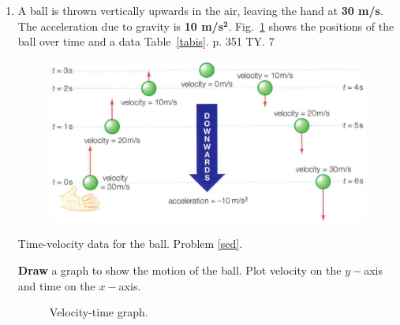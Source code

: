 \documentclass[A4,12pt]{article}
\begin{document}
\begin{enumerate}[label=\bfseries (\arabic*)]
\item \label{sed} A ball is thrown vertically upwards in the air, leaving the hand at \textbf{30 m/s}. The acceleration due to gravity is \textbf{10 m/s}$\bm{^2}$. Fig.~\ref{pijiji} shows the positions of the ball over time and a data Table~\ref{tabis}. \cite{CCEADA} p. 351 TY. 7
%
\begin{figure}[H]
    \centering
    \includegraphics[scale=0.5]{TY.png}
    \caption{}
    \label{pijiji}
\end{figure}
%
\begin{table}[H]
    \centering
    \caption{Time-velocity data for the ball. Problem \ref{sed}.}
    \caption{}
    \label{tabis}
\end{table}
%
\textbf{Draw} a graph to show the motion of the ball. Plot velocity on the $y-$axis and time on the $x-$axis. 
%
%
\begin{figure}[H]
    \centering
    \caption{Velocity-time graph.}
    \label{fig:my_label}
\end{figure}


















\end{enumerate}
\end{document}
